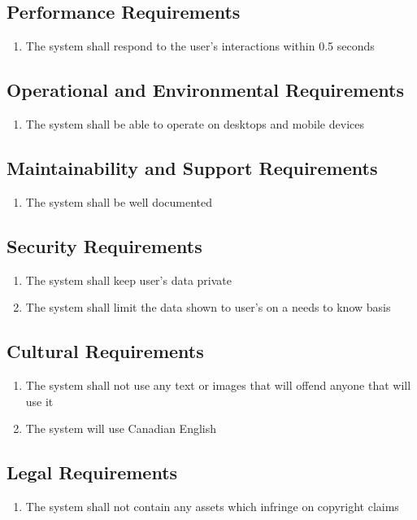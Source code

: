 \documentclass[12pt]{article}
\begin{document}
\subsection{Performance Requirements}
\begin{enumerate}[PR\arabic*.]
	\item The system shall respond to the user's interactions within 0.5 seconds
\end{enumerate}

\subsection{Operational and Environmental Requirements}
\begin{enumerate}[OE\arabic*.]
	\item The system shall be able to operate on desktops and mobile devices
\end{enumerate}

\subsection{Maintainability and Support Requirements}
\begin{enumerate}[MS\arabic*.]
	\item The system shall be well documented
\end{enumerate}

\subsection{Security Requirements}
\begin{enumerate}[SR\arabic*.]
	\item The system shall keep user's data private
	\item The system shall limit the data shown to user's on a needs to know basis
\end{enumerate}

\subsection{Cultural Requirements}
\begin{enumerate}[CR\arabic*.]
	\item The system shall not use any text or images that will offend anyone that will use it
	\item The system will use Canadian English
\end{enumerate}

\subsection{Legal Requirements}
\begin{enumerate}[LR\arabic*.]
	\item The system shall not contain any assets which infringe on copyright claims
\end{enumerate}
\end{document}
